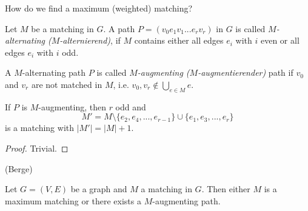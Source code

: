 \begin{qstn}
How do we find a maximum (weighted) matching?
\end{qstn}

\begin{defn} %
Let $M$ be a matching in $G$. A path $P = (v_0 e_1 v_1 ... e_r v_r)$ in $G$
is called \emph{$M$-alternating ($M$-alternierend)}, if $M$ contains either
all edges $e_i$ with $i$ even or all edges $e_i$ with $i$ odd.

A $M$-alternating path $P$ is called \emph{$M$-augmenting ($M$-augmentierender)} path if $v_0$ and
$v_r$ are not matched in $M$, i.e. $v_0, v_r \not\in \bigcup_{e \in M} e$.
\end{defn}

\begin{lem} %
If $P$ is $M$-augmenting, then $r$ odd and
\[
	M' = M \setminus \{ e_2, e_4, ..., e_{r-1} \} \cup \{ e_1, e_3, ..., e_r \}
\]
is a matching with $|M'| = |M| + 1$.
\end{lem}
\begin{proof}
Trivial.
\end{proof}

\begin{lem} %
(Berge)

Let $G = (V, E)$ be a graph and $M$ a matching in $G$.
Then either $M$ is a maximum matching or there exists a $M$-augmenting path.
\end{lem}
